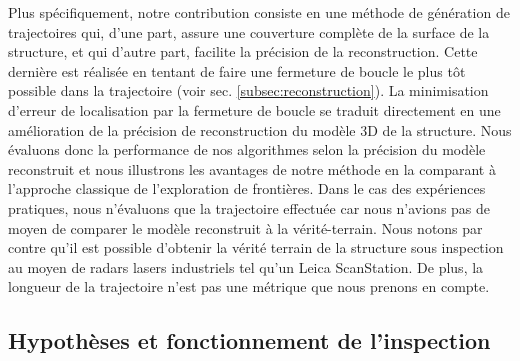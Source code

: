 Plus spécifiquement, notre contribution consiste en une méthode de génération de trajectoires qui, d'une part, assure une couverture complète de la surface de la structure, et qui d'autre part, facilite la précision de la reconstruction. Cette dernière est réalisée en tentant de faire une fermeture de boucle le plus tôt possible dans la trajectoire (voir sec. \ref{subsec:reconstruction}). La minimisation d'erreur de localisation par la fermeture de boucle se traduit directement en une amélioration de la précision de reconstruction du modèle 3D de la structure. Nous évaluons donc la performance de nos algorithmes selon la précision du modèle reconstruit et nous illustrons les avantages de notre méthode en la comparant à l'approche classique de l'exploration de frontières. Dans le cas des expériences pratiques, nous n'évaluons que la trajectoire effectuée car nous n'avions pas de moyen de comparer le modèle reconstruit à la vérité-terrain. Nous notons par contre qu'il est possible d'obtenir la vérité terrain de la structure sous inspection au moyen de radars lasers industriels tel qu'un Leica ScanStation. De plus, la longueur de la trajectoire n'est pas une métrique que nous prenons en compte.




\subsection{Hypothèses et fonctionnement de l'inspection}
\label{sec:ugv_hypothesis}

